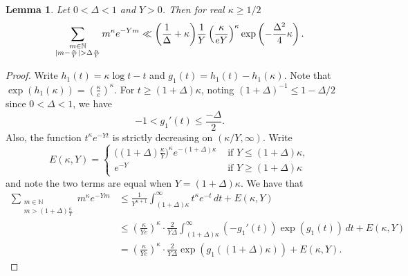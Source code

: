 \documentclass[12pt, a4paper]{amsart}
\newtheorem{lemma}[theorem]{Lemma}
\theoremstyle{definition}
\newcommand {\1} {\mathbf{1}}
\numberwithin{equation}{section}
\begin{document}
\begin{lemma} \label{lem:incomplete}
Let $0< \Delta <1$ and $Y>0$. Then for real $\kappa \ge 1/2$
\begin{equation} \notag
\sum_{\substack{m \in \mathbb N \\|m -\frac{\kappa}{Y}|> \Delta \frac{\kappa}{Y}}} m^{\kappa} e^{-Ym}\ll \bigg(\frac{1}{ \Delta } + \kappa \bigg)\frac{1}{Y}\left( \frac{\kappa}{e Y}\right)^{\kappa} \exp\left( -\frac{\Delta^2}{4} \kappa \right) .
\end{equation}
\end{lemma}
\begin{proof}
Write $h_1(t)=\kappa \log t-t$ and $g_1(t)=h_1(t)-h_1(\kappa)$. Note that $\exp(h_1(\kappa))=\left( \frac{\kappa}{e}\right)^{\kappa}$. For $ t \ge (1+\Delta) \kappa$, noting $(1+\Delta)^{-1} \le 1-\Delta/2$ since $0< \Delta <1$, we have
\[
-1 < g_1'(t) \le  \frac{-\Delta}{2}.
\]
Also, the function $t^{\kappa}e^{-Yt}$ is strictly decreasing on $ (\kappa/Y, \infty)$. Write
\begin{equation*}
E(\kappa,Y)=\begin{cases}
\big((1+\Delta) \frac{\kappa}{Y} \big)^{\kappa} e^{-(1+\Delta)\kappa}  & \text{ if } Y \le (1+\Delta)\kappa,\\
e^{-Y}  & \text{ if } Y \ge (1+\Delta)\kappa
\end{cases}
\end{equation*}
and note the two terms are equal when $Y=(1+\Delta)\kappa$.
We have that
\[
\begin{split}
\sum_{\substack{m \in \mathbb N \\ m > (1+\Delta) \frac{\kappa}{Y}}} m^{\kappa} e^{-Ym} & \le \frac{1}{Y^{\kappa+1}} \int_{(1+\Delta)\kappa}^{\infty} t^{\kappa} e^{-t} \, dt+E(\kappa,Y) \\
& \le \left( \frac{\kappa}{Ye}\right)^{\kappa} \cdot \frac{2 }{Y\Delta} \int_{(1+\Delta)\kappa}^{\infty}(-g_1'(t)) \exp(g_1(t)) \, dt+E(\kappa,Y)\\
&=\left( \frac{\kappa}{Ye}\right)^{\kappa} \cdot \frac{2}{Y\Delta} \exp(g_1((1+\Delta)\kappa))+E(\kappa,Y).
\end{split}
\]



\end{proof}
\end{document}
